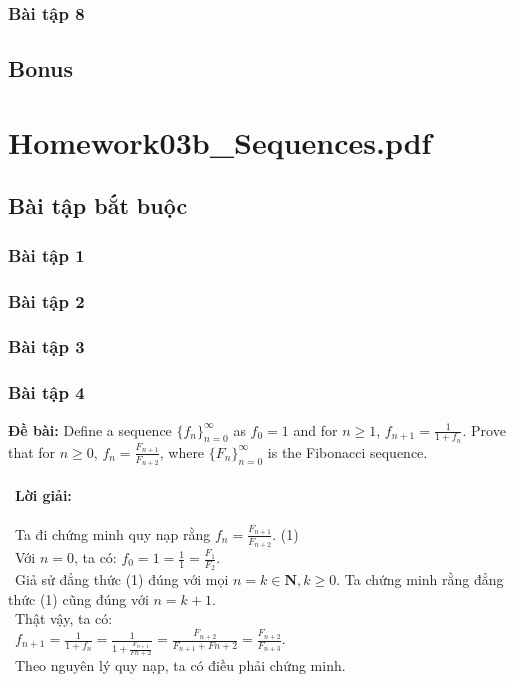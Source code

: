 \documentclass[a4paper]{article}
\begin{document}
\subsubsection{Bài tập 8}

\clearpage
\subsection{Bonus}
\clearpage

\section{Homework03b\_Sequences.pdf}
\subsection{Bài tập bắt buộc}
\subsubsection{Bài tập 1}

\clearpage
\subsubsection{Bài tập 2}

\clearpage
\subsubsection{Bài tập 3}

\clearpage
\subsubsection{Bài tập 4}
\textbf{Đề bài: }Define a sequence $\{f_n\}_{n=0}^\infty$ as $f_0 = 1$ and for $n \geq 1$, $f_{n+1} = \frac{1}{1+f_n}$. Prove that for $n \geq 0$, $f_n = \frac{F_{n+1}}{F_{n+2}}$, where $\{F_n\}_{n=0}^\infty$ is the Fibonacci sequence. \\\ \\\
\textbf{Lời giải: } \\\ \\\
Ta đi chứng minh quy nạp rằng $f_n = \frac{F_{n+1}}{F_{n+2}}$. (1)\\\
Với $n = 0$, ta có: $f_0 = 1 = \frac{1}{1} = \frac{F_1}{F_2}$. \\\
Giả sử đẳng thức (1) đúng với mọi $n = k \in \textbf{N}, k \geq 0$.
Ta chứng minh rằng đẳng thức (1) cũng đúng với $n = k+1$.\\\
Thật vậy, ta có: \\\
$f_{n+1} = \frac{1}{1+f_n} = \frac{1}{1+\frac{F_{n+1}}{F{n+2}}} = \frac{F_{n+2}}{F_{n+1} + F{n+2}} = \frac{F_{n+2}}{F_{n+3}}$. \\\
Theo nguyên lý quy nạp, ta có điều phải chứng minh.
\clearpage
\end{document}
